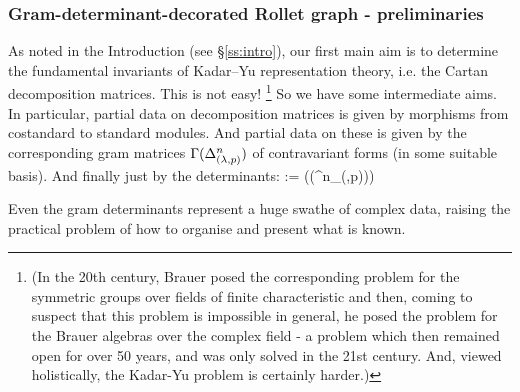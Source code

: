 \subsubsection{Gram-determinant-decorated Rollet graph - preliminaries}
As noted in the Introduction (see 
\S\ref{ss:intro}),  %
our first main aim is 
to determine the fundamental invariants of Kadar--Yu representation theory, i.e. the Cartan decomposition matrices. 
This is not easy!%
\footnote{(In the 20th century, Brauer posed the corresponding problem for the symmetric groups over fields of finite characteristic and then, coming to suspect that this problem is impossible in general, he posed the problem for the Brauer algebras over the complex field - a problem which  then remained open for over 50 years, and was only solved in the 21st century. And, viewed holistically, the Kadar-Yu problem is certainly harder.)} 
So we have some intermediate aims. 
In particular, partial data on decomposition matrices is given by morphisms from costandard to standard modules. %
And partial data on these is given 
by the corresponding gram matrices 
$\Gamma(\Delta^{n}_{(\lambda,p)})$
of contravariant forms (in some suitable basis). 
And finally just by the determinants:
\beq
   \; := \;  \det(\Gamma(\Deltaa^{n}_{(\lambda,p)}))\label{eq:detnot}
\eq


Even the gram determinants represent a huge swathe of complex data, raising the practical problem 
of how to organise and present what is known. 

\medskip 


\newcommand{\V}{{\mathcal V}}
\newcommand{\RollV}{\Roll^{{\mathcal V}}}
\newcommand{\RollD}{\Roll^{{\Deltaa}}}

